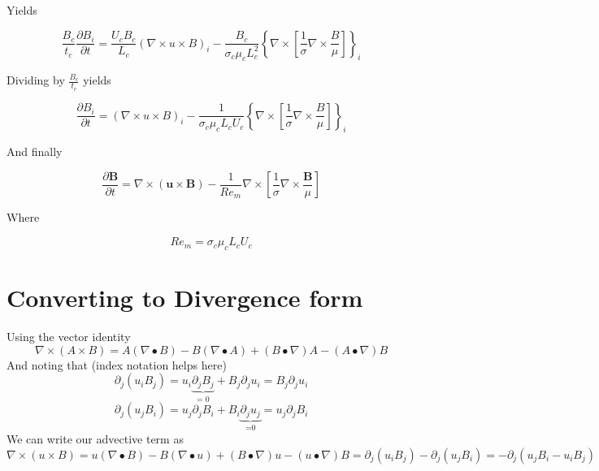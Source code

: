 \documentclass[11pt]{article}
\begin{document}
Yields

\begin{equation}
	\frac{B_c}{t_c} 
	\frac{\partial B_i}{\partial t} 
	= 
	\frac{U_c B_c}{L_c}
	(\nabla \times u \times B)_i
	- 
	\frac{B_c}{\sigma_c \mu_c L_c^2}
	\left\{
	\nabla \times 
	\left[ \frac{1}{\sigma}
	\nabla \times \frac{B}{\mu} \right]
	\right\}_i
\end{equation}

Dividing by $\frac{B_c}{t_c}$ yields

\begin{equation}
	\frac{\partial B_i}{\partial t} 
	= 
	(\nabla \times u \times B)_i
	- 
	\frac{1}{\sigma_c \mu_c L_c U_c}
	\left\{
	\nabla \times 
	\left[ \frac{1}{\sigma}
	\nabla \times \frac{B}{\mu} \right]
	\right\}_i
\end{equation}

And finally

\begin{equation}
	\boxed{
	\frac{\partial \pmb{B}}{\partial t} = 
	\nabla \times (\pmb{u} \times \pmb{B})
	- 
	\frac{1}{Re_m}
	\nabla \times 
	\left[ \frac{1}{\sigma}
	\nabla \times \frac{\pmb{B}}{\mu} \right]
	}
\end{equation}

Where

\begin{equation}
	Re_m = \sigma_c \mu_c L_c U_c
\end{equation}


\section{Converting to Divergence form}

Using the vector identity
\begin{equation}
	\nabla \times (A\times B) = 
	A(\nabla \bullet B) 
	- B(\nabla \bullet A)
	+(B \bullet \nabla)A - (A \bullet \nabla)B
\end{equation}
And noting that (index notation helps here)
\begin{equation}
	\partial_j (u_i B_j) = 
	u_i \underbrace{\partial_j B_j}_\text{= 0} + B_j \partial_j u_i
	= B_j \partial_j u_i
\end{equation}
\begin{equation}
	\partial_j (u_j B_i) = 
	u_j \partial_j B_i + B_i \underbrace{\partial_j u_j}_\text{=0}
	= u_j \partial_j B_i
\end{equation}
We can write our advective term as
\begin{equation}
	\nabla \times (u \times B) 
	= u(\nabla \bullet B) 
	- B(\nabla \bullet u)
	+ (B \bullet \nabla)u
	- (u \bullet \nabla)B
	=
	\partial_j (u_i B_j) - \partial_j (u_j B_i)
	=
	-\partial_j (u_j B_i - u_i B_j)
\end{equation}
\end{document}
